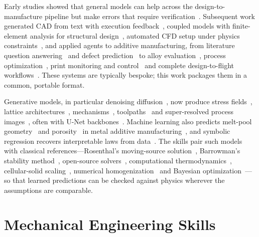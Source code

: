 \documentclass[11pt]{article}
\begin{document}
Early studies showed that
general models can help across the design-to-manufacture pipeline but make errors that require
verification~\cite{makatura2023llmdesign}. Subsequent work generated CAD from text with execution
feedback~\cite{badagabettu2024query2cad,barkley2026cadsmith}, coupled models with finite-element
analysis for structural design~\cite{jadhav2026designer}, automated CFD setup under physics
constraints~\cite{oza2026cfdforge}, and applied agents to additive manufacturing, from literature
question answering~\cite{chandrasekhar2024amgpt} and defect prediction~\cite{pak2025additivellm}
to alloy evaluation~\cite{pak2026alloy}, process optimization~\cite{pak2026sls}, print monitoring
and control~\cite{jadhav2025llm3dprint} and complete design-to-flight workflows~\cite{pak2026rocketsmith}.
These systems are typically bespoke; this work packages them in a common, portable format.

Generative models, in particular denoising
diffusion~\cite{ho2020ddpm,nichol2021improved,song2021ddim,ho2022cfg}, now produce stress
fields~\cite{jadhav2023stressd}, lattice architectures~\cite{jadhav2024glu3d}, mechanisms~\cite{jadhav2026linkd},
toolpaths~\cite{wang2026image2gcode} and super-resolved process images~\cite{ogoke2025superres},
often with U-Net backbones~\cite{ronneberger2015unet}. Machine learning also predicts melt-pool
geometry~\cite{akbari2022meltpoolnet} and porosity~\cite{pak2024thermopore} in metal additive
manufacturing~\cite{debroy2018am,king2014keyhole}, and symbolic regression recovers interpretable
laws from data~\cite{schmidt2009distilling,udrescu2020aifeynman,shojaee2025llmsr}. The skills pair
such models with classical references---Rosenthal's moving-source solution~\cite{rosenthal1946},
Barrowman's stability method~\cite{barrowman1967}, open-source solvers~\cite{weller1998openfoam,niskanen2009openrocket},
computational thermodynamics~\cite{andersson2002thermocalc}, cellular-solid
scaling~\cite{gibson1997cellular,alketan2019tpms}, numerical homogenization~\cite{dong2019homo3d}
and Bayesian optimization~\cite{jones1998ego}---so that learned predictions can be checked against
physics wherever the assumptions are comparable.

\section{Mechanical Engineering Skills}
\label{sec:anatomy}
\label{sec:library}
\label{sec:principles}
\end{document}
